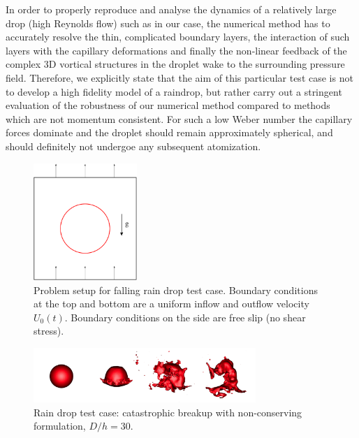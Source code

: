 In order to properly reproduce and analyse the dynamics of a relatively large drop (high Reynolds flow) such as in our case, the numerical method has to accurately resolve the thin, complicated boundary layers, the interaction of such layers with the capillary deformations and finally the non-linear feedback of the complex 3D vortical structures in the droplet wake to the surrounding pressure field. Therefore, we explicitly state that the aim of this particular test case is not to develop a high fidelity model of a raindrop, but rather carry out a stringent evaluation of the robustness of our numerical method compared to methods which are not momentum consistent. For such a low Weber number the capillary forces dominate and the droplet should remain approximately spherical, and should definitely not undergoe any subsequent atomization. 


\begin{figure}[h!]
\begin{center}
\includegraphics[width=0.35\textwidth]{Figures/setup.pdf}
\end{center}
\caption{Problem setup for falling rain drop test case. Boundary conditions 
at the top and bottom are a uniform inflow and outflow velocity $U_0(t)$. 
Boundary conditions on the side are free slip (no shear stress).}
\label{setup}
\end{figure}


\begin{figure}
\begin{center}
\includegraphics[width=0.75\textwidth]{Figures/cata.png}
\end{center}
\caption{Rain drop test case: catastrophic breakup with non-conserving 
formulation, $D/h=30$.}
\label{cata}
\end{figure}

